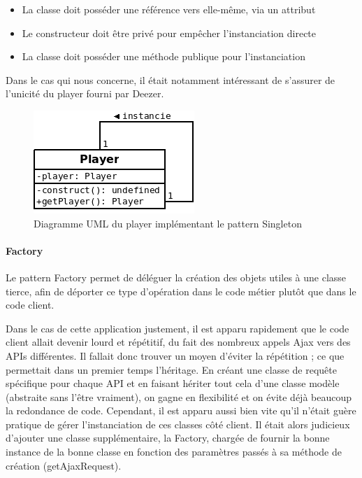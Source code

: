 \documentclass[a4paper,12pt]{article}
\begin{document}
\begin{itemize}
 \item{La classe doit posséder une référence vers elle-même, via un attribut}
 \item{Le constructeur doit être privé pour empêcher l'instanciation directe}
 \item{La classe doit posséder une méthode publique pour l'instanciation}
\end{itemize}

Dans le cas qui nous concerne, il était notamment intéressant de s'assurer de l'unicité du player fourni par Deezer.

\begin{figure}[!h]
  \begin{center}
    \includegraphics[scale=0.5]{Singleton.png}
    \caption{Diagramme UML du player implémentant le pattern Singleton}
  \end{center}
\end{figure}

\paragraph{Factory}

Le pattern Factory permet de déléguer la création des objets utiles à une classe tierce, afin de déporter ce type d'opération dans le code métier plutôt que dans le code client.

Dans le cas de cette application justement, il est apparu rapidement que le code client allait devenir lourd et répétitif, du fait des nombreux appels Ajax vers des APIs différentes. Il fallait donc trouver un moyen d'éviter la répétition ; ce que permettait dans un premier temps l'héritage. En créant une classe de requête spécifique pour chaque API et en faisant hériter tout cela d'une classe modèle (abstraite sans l'être vraiment), on gagne en flexibilité et on évite déjà beaucoup la redondance de code. Cependant, il est apparu aussi bien vite qu'il n'était guère pratique de gérer l'instanciation de ces classes côté client. Il était alors judicieux d'ajouter une classe supplémentaire, la Factory, chargée de fournir la bonne instance de la bonne classe en fonction des paramètres passés à sa méthode de création (getAjaxRequest).
\end{document}
